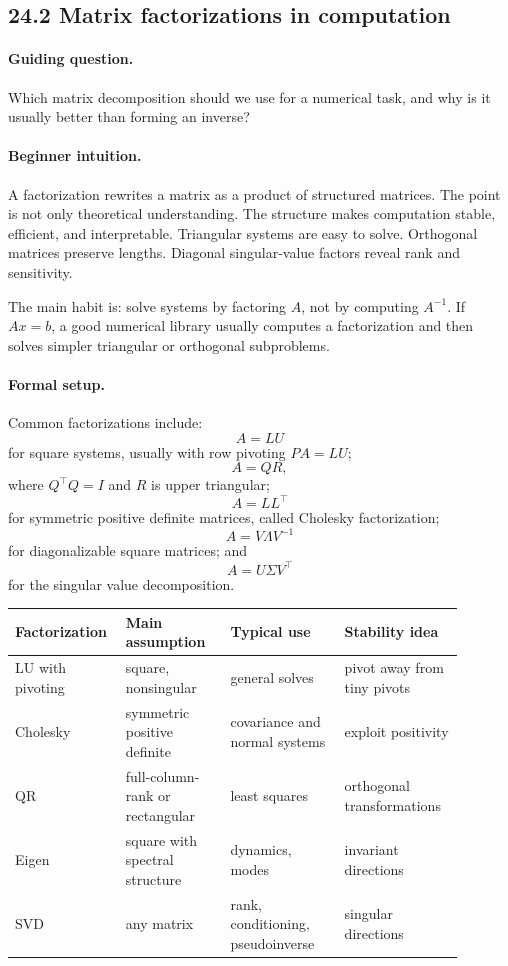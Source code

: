 \subsection{24.2 Matrix factorizations in computation}

\paragraph{Guiding question.}
Which matrix decomposition should we use for a numerical task, and why is it usually better than forming an inverse?

\paragraph{Beginner intuition.}
A factorization rewrites a matrix as a product of structured matrices. The point is not only theoretical understanding. The structure makes computation stable, efficient, and interpretable. Triangular systems are easy to solve. Orthogonal matrices preserve lengths. Diagonal singular-value factors reveal rank and sensitivity.

The main habit is: solve systems by factoring \(A\), not by computing \(A^{-1}\). If \(Ax=b\), a good numerical library usually computes a factorization and then solves simpler triangular or orthogonal subproblems.

\paragraph{Formal setup.}
Common factorizations include:
\[
A=LU
\]
for square systems, usually with row pivoting \(PA=LU\);
\[
A=QR,
\]
where \(Q^\top Q=I\) and \(R\) is upper triangular;
\[
A=LL^\top
\]
for symmetric positive definite matrices, called Cholesky factorization;
\[
A=V\Lambda V^{-1}
\]
for diagonalizable square matrices; and
\[
A=U\Sigma V^\top
\]
for the singular value decomposition.

\begin{center}
\small
\begin{tabular}{@{}p{0.18\linewidth}p{0.22\linewidth}p{0.24\linewidth}p{0.25\linewidth}@{}}
\toprule
Factorization & Main assumption & Typical use & Stability idea\\
\midrule
LU with pivoting & square, nonsingular & general solves & pivot away from tiny pivots\\
Cholesky & symmetric positive definite & covariance and normal systems & exploit positivity\\
QR & full-column-rank or rectangular & least squares & orthogonal transformations\\
Eigen & square with spectral structure & dynamics, modes & invariant directions\\
SVD & any matrix & rank, conditioning, pseudoinverse & singular directions\\
\bottomrule
\end{tabular}
\end{center}

